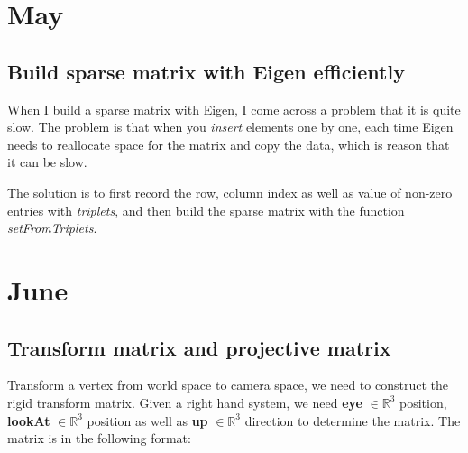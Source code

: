 \chapter{May}

\section{Build sparse matrix with Eigen efficiently} 

When I build a sparse matrix with Eigen, I come across a problem that it is quite slow. The problem is that
when you \textit{insert} elements one by one, each time Eigen needs to reallocate space for the matrix and copy
the data, which is reason that it can be slow. 

The solution is to first record the row, column index as well as value of non-zero entries with \textit{triplets},
and then build the sparse matrix with the function \textit{setFromTriplets}.

\chapter{June}
\section{Transform matrix and projective matrix} 
Transform a vertex from world space to camera space, we need to construct the rigid transform matrix. Given a right
hand system, we need \textbf{eye} $\in \mathbb{R}^3$ position, \textbf{lookAt} $\in \mathbb{R}^3$ position as well as \textbf{up} $\in \mathbb{R}^3$ direction to determine the matrix.
The matrix is in the following format:


